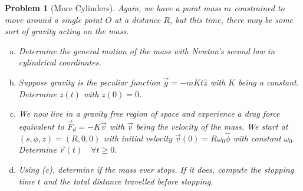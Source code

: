 \documentclass{article}
\theoremstyle{norm}
\newtheorem{prb}[thm]{Problem}
\begin{document}
\begin{prb}[More Cylinders]
Again, we have a point mass $m$ constrained to move around a single
point $O$ at a distance $R$, but this time, there may be some sort of
gravity acting on the mass.
\begin{enumerate}[(a)]
\item Determine the general motion of the mass with Newton's second law
in cylindrical coordinates.
\item Suppose gravity is the peculiar function $\vec{g} = -mKt\hat{z}$
with $K$ being a constant. Determine $z(t)$ with $z(0) = 0$.
\item We now live in a gravity free region of space and experience a
drag force equivalent to $\vec{F}_d = -K \vec{v}$ with $\vec{v}$ being
the velocity of the mass. We start at $(s, \phi, z) = (R, 0, 0)$ with
initial velocity $\vec{v}(0) = R \omega_0 \hat{\phi}$ with constant
$\omega_0$. Determine $\vec{r}(t) \quad \forall t \geq 0$.
\item Using (c), determine if the mass ever stops. If it does, compute
the stopping time $t$ and the total distance travelled before stopping.
\end{enumerate}
\end{prb}
\end{document}
